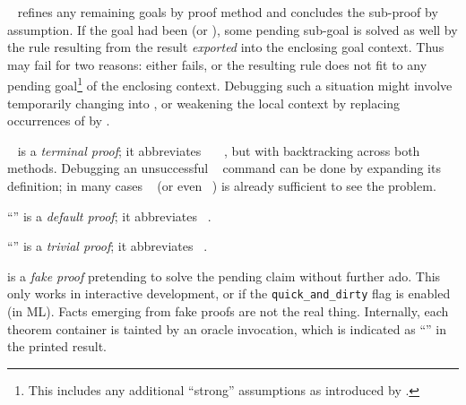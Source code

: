 \begin{isabellebody}
\begin{isamarkuptext}
\begin{descr}
  \item [\isa{\isacommand{qed}}~\isa{m\isactrlsub {\isadigit{2}}}] refines any remaining
  goals by proof method  and concludes the
  sub-proof by assumption.  If the goal had been  (or
  ), some pending sub-goal is solved as well by the rule
  resulting from the result \emph{exported} into the enclosing goal
  context.  Thus  may fail for two reasons: either  fails, or the resulting rule does not fit to any
  pending goal\footnote{This includes any additional ``strong''
  assumptions as introduced by .} of the enclosing
  context.  Debugging such a situation might involve temporarily
  changing  into , or weakening the
  local context by replacing occurrences of  by
  .
  
  \item [\isa{\isacommand{by}}~\isa{m\isactrlsub {\isadigit{1}}\ m\isactrlsub {\isadigit{2}}}] is a
  \emph{terminal proof}; it abbreviates
  ~~~, but with backtracking across both methods.  Debugging
  an unsuccessful ~
  command can be done by expanding its definition; in many cases
  ~ (or even ~) is already sufficient to see the
  problem.

  \item [``\isa{\isacommand{{\isachardot}{\isachardot}}}''] is a \emph{default
  proof}; it abbreviates ~.

  \item [``\isa{\isacommand{{\isachardot}}}''] is a \emph{trivial
  proof}; it abbreviates ~.
  
  \item [\isa{\isacommand{sorry}}] is a \emph{fake proof}
  pretending to solve the pending claim without further ado.  This
  only works in interactive development, or if the \verb|quick_and_dirty| flag is enabled (in ML).  Facts emerging from fake
  proofs are not the real thing.  Internally, each theorem container
  is tainted by an oracle invocation, which is indicated as ``\isa{{\isacharbrackleft}{\isacharbang}{\isacharbrackright}}'' in the printed result.
  

\end{descr}
\end{isamarkuptext}
\end{isabellebody}
